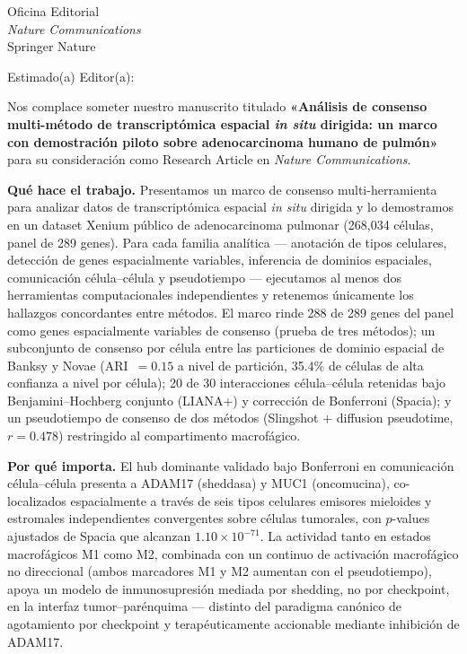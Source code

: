 \documentclass[11pt,a4paper]{letter}
\date{}
\begin{document}
\begin{letter}{Oficina Editorial\\\textit{Nature Communications}\\Springer Nature}
\opening{Estimado(a) Editor(a):}

Nos complace someter nuestro manuscrito titulado \textbf{«Análisis de consenso multi-método de transcriptómica espacial \textit{in situ} dirigida: un marco con demostración piloto sobre adenocarcinoma humano de pulmón»} para su consideración como Research Article en \textit{Nature Communications}.

\textbf{Qué hace el trabajo.} Presentamos un marco de consenso multi-herramienta para analizar datos de transcriptómica espacial \textit{in situ} dirigida y lo demostramos en un dataset Xenium público de adenocarcinoma pulmonar (268{,}034 células, panel de 289 genes). Para cada familia analítica --- anotación de tipos celulares, detección de genes espacialmente variables, inferencia de dominios espaciales, comunicación célula--célula y pseudotiempo --- ejecutamos al menos dos herramientas computacionales independientes y retenemos únicamente los hallazgos concordantes entre métodos. El marco rinde 288 de 289 genes del panel como genes espacialmente variables de consenso (prueba de tres métodos); un subconjunto de consenso por célula entre las particiones de dominio espacial de Banksy y Novae (ARI~$=0.15$ a nivel de partición, 35.4\% de células de alta confianza a nivel por célula); 20 de 30 interacciones célula--célula retenidas bajo Benjamini--Hochberg conjunto (LIANA+) y corrección de Bonferroni (Spacia); y un pseudotiempo de consenso de dos métodos (Slingshot + diffusion pseudotime, $r = 0.478$) restringido al compartimento macrofágico.

\textbf{Por qué importa.} El hub dominante validado bajo Bonferroni en comunicación célula--célula presenta a ADAM17 (sheddasa) y MUC1 (oncomucina), co-localizados espacialmente a través de seis tipos celulares emisores mieloides y estromales independientes convergentes sobre células tumorales, con $p$-values ajustados de Spacia que alcanzan $1.10 \times 10^{-71}$. La actividad tanto en estados macrofágicos M1 como M2, combinada con un continuo de activación macrofágico no direccional (ambos marcadores M1 y M2 aumentan con el pseudotiempo), apoya un modelo de inmunosupresión mediada por shedding, no por checkpoint, en la interfaz tumor--parénquima --- distinto del paradigma canónico de agotamiento por checkpoint y terapéuticamente accionable mediante inhibición de ADAM17.


\end{letter}
\end{document}
